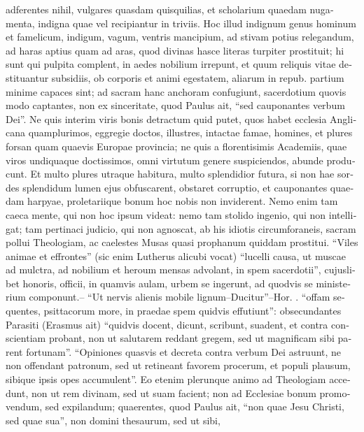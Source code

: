 \begin{latin}
adferentes nihil, vulgares quasdam quisquilias, et scholarium quaedam
nugamenta, indigna quae vel recipiantur in triviis. Hoc illud indignum genus
hominum et famelicum, indigum, vagum, ventris mancipium, ad stivam potius
relegandum, ad haras aptius quam ad aras, quod divinas hasce literas turpiter
prostituit; hi sunt qui pulpita complent, in aedes nobilium irrepunt, et quum
reliquis vitae destituantur subsidiis, ob corporis et animi egestatem,
aliarum in repub. partium minime capaces sint; ad sacram hanc anchoram
confugiunt, sacerdotium quovis modo captantes, non ex sinceritate, quod
Paulus ait, \enquote{sed cauponantes verbum Dei}. Ne quis
interim viris bonis detractum quid putet, quos habet ecclesia Anglicana
quamplurimos, eggregie doctos, illustres, intactae famae, homines, et plures
forsan quam quaevis Europae provincia; ne quis a florentisimis Academiis,
quae viros undiquaque doctissimos, omni virtutum genere suspiciendos, abunde
producunt. Et multo plures utraque habitura, multo splendidior futura, si non
hae sordes splendidum lumen ejus obfuscarent, obstaret corruptio, et
cauponantes quaedam harpyae, proletariique bonum hoc nobis non inviderent.
Nemo enim tam caeca mente, qui non hoc ipsum videat: nemo tam stolido
ingenio, qui non intelligat; tam pertinaci judicio, qui non agnoscat, ab his
idiotis circumforaneis, sacram pollui Theologiam, ac caelestes Musas quasi
prophanum quiddam prostitui. \enquote{Viles animae et effrontes} (sic enim Lutherus
alicubi vocat) \enquote{lucelli causa, ut muscae ad mulctra, ad
nobilium et heroum mensas advolant, in spem sacerdotii}, cujuslibet honoris,
officii, in quamvis aulam, urbem se ingerunt, ad quodvis se ministerium
componunt.-- \enquote{Ut nervis alienis mobile lignum--Ducitur}--Hor.
. \enquote{offam
sequentes, psittacorum more, in praedae spem quidvis effutiunt}:
obsecundantes Parasiti (Erasmus ait) \enquote{quidvis docent,
dicunt, scribunt, suadent, et contra conscientiam probant, non ut salutarem
reddant gregem, sed ut magnificam sibi parent fortunam}.
\enquote{Opiniones quasvis et decreta contra verbum Dei
astruunt, ne non offendant patronum, sed ut retineant favorem procerum, et
populi plausum, sibique ipsis opes accumulent}. Eo etenim plerunque animo ad
Theologiam accedunt, non ut rem divinam, sed ut suam facient; non ad
Ecclesiae bonum promovendum, sed expilandum; quaerentes, quod Paulus ait,
\enquote{non quae Jesu Christi, sed quae sua}, non domini thesaurum, sed ut sibi,

\end{latin}

